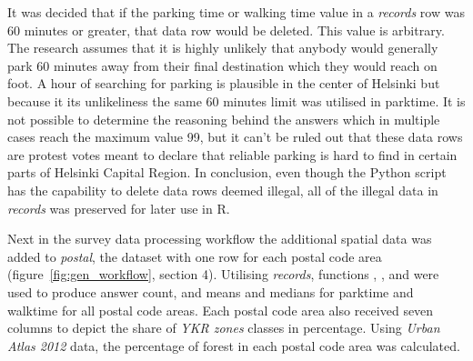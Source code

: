 It was decided that if the parking time or walking time value in a \textit{records} row was 60 minutes or greater, that data row would be deleted. This value is arbitrary. The research assumes that it is highly unlikely that anybody would generally park 60 minutes away from their final destination which they would reach on foot. A hour of searching for parking is plausible in the center of Helsinki but because it its unlikeliness the same 60 minutes limit was utilised in parktime. It is not possible to determine the reasoning behind the answers which in multiple cases reach the maximum value 99, but it can't be ruled out that these data rows are protest votes meant to declare that reliable parking is hard to find in certain parts of Helsinki Capital Region. In conclusion, even though the Python script has the capability to delete data rows deemed illegal, all of the illegal data in \textit{records} was preserved for later use in R.

Next in the survey data processing workflow the additional spatial data was added to \textit{postal}, the dataset with one row for each postal code area (figure~\ref{fig:gen_workflow}, section 4). Utilising \textit{records}, functions , , and  were used to produce answer count, and means and medians for parktime and walktime for all postal code areas. Each postal code area also received seven columns to depict the share of \textit{YKR zones} classes in percentage. Using \textit{Urban Atlas 2012} data, the percentage of forest in each postal code area was calculated. 

